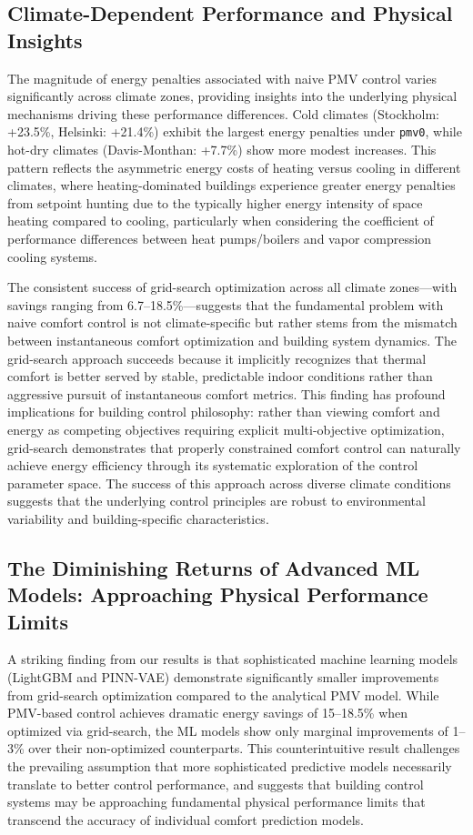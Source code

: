 \subsection{Climate-Dependent Performance and Physical Insights}

The magnitude of energy penalties associated with naive PMV control varies significantly across climate zones, providing insights into the underlying physical mechanisms driving these performance differences. Cold climates (Stockholm: +23.5\%, Helsinki: +21.4\%) exhibit the largest energy penalties under \texttt{pmv0}, while hot-dry climates (Davis-Monthan: +7.7\%) show more modest increases. This pattern reflects the asymmetric energy costs of heating versus cooling in different climates, where heating-dominated buildings experience greater energy penalties from setpoint hunting due to the typically higher energy intensity of space heating compared to cooling, particularly when considering the coefficient of performance differences between heat pumps/boilers and vapor compression cooling systems.

The consistent success of grid-search optimization across all climate zones—with savings ranging from 6.7--18.5\%—suggests that the fundamental problem with naive comfort control is not climate-specific but rather stems from the mismatch between instantaneous comfort optimization and building system dynamics. The grid-search approach succeeds because it implicitly recognizes that thermal comfort is better served by stable, predictable indoor conditions rather than aggressive pursuit of instantaneous comfort metrics. This finding has profound implications for building control philosophy: rather than viewing comfort and energy as competing objectives requiring explicit multi-objective optimization, grid-search demonstrates that properly constrained comfort control can naturally achieve energy efficiency through its systematic exploration of the control parameter space. The success of this approach across diverse climate conditions suggests that the underlying control principles are robust to environmental variability and building-specific characteristics.

\subsection{The Diminishing Returns of Advanced ML Models: Approaching Physical Performance Limits}

A striking finding from our results is that sophisticated machine learning models (LightGBM and PINN-VAE) demonstrate significantly smaller improvements from grid-search optimization compared to the analytical PMV model. While PMV-based control achieves dramatic energy savings of 15--18.5\% when optimized via grid-search, the ML models show only marginal improvements of 1--3\% over their non-optimized counterparts. This counterintuitive result challenges the prevailing assumption that more sophisticated predictive models necessarily translate to better control performance, and suggests that building control systems may be approaching fundamental physical performance limits that transcend the accuracy of individual comfort prediction models.

